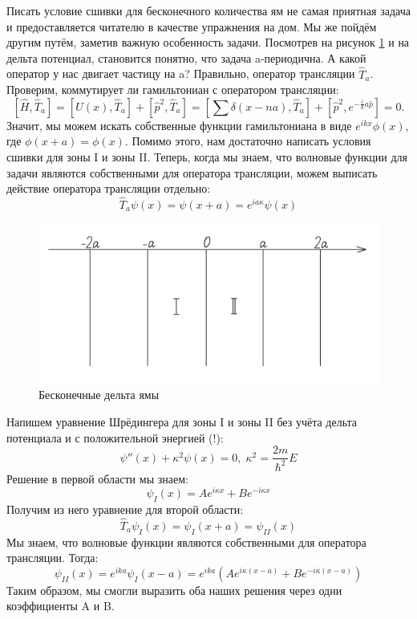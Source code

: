Писать условие сшивки для бесконечного количества ям не самая приятная задача и предоставляется читателю в качестве упражнения на дом. Мы же пойдём другим путём, заметив важную особенность задачи. Посмотрев на рисунок \ref{fig 4.5} и на дельта потенциал, становится понятно, что задача a-периодична. А какой оператор у нас двигает частицу на a? Правильно, оператор трансляции $\hat{T}_a$. Проверим, коммутирует ли гамильтониан с оператором трансляции:
\[
[\hat{H}, \hat{T}_a] = [U(x), \hat{T}_a] + [\hat{p}^2, \hat{T}_a] = [\sum\delta(x-na), \hat{T}_a] + [\hat{p}^2, e^{-\frac{i}{\hbar}a\hat{p}}] = 0.
\]
Значит, мы можем искать собственные функции гамильтониана в виде $e^{ikx}\phi(x)$, где $\phi(x + a) = \phi(x)$. Помимо этого, нам достаточно написать условия сшивки для зоны I и зоны II. Теперь, когда мы знаем, что волновые функции для задачи являются собственными для оператора трансляции, можем выписать действие оператора трансляции отдельно:
\[
\hat{T}_a\psi(x) = \psi(x+a) = e^{ia\kappa}\psi(x)
\]
\begin{figure}[!ht]
\centering
\includegraphics[scale=0.27]{class_4/images/inf delta hole.png}
\caption{Бесконечные дельта ямы}
\label{fig 4.5}
\end{figure}

Напишем уравнение Шрёдингера для зоны I и зоны II без учёта дельта потенциала и с положительной энергией (!):
\[
\psi''(x) + \kappa^2\psi(x) = 0, \; \kappa^2 = \frac{2m}{\hbar^2}E
\]
Решение в первой области мы знаем:
\[
\psi_I(x) = Ae^{i\kappa x} + Be^{-i\kappa x}
\]
Получим из него уравнение для второй области:
\[
\hat{T}_a\psi_I(x) = \psi_I(x+a) = \psi_{II}(x)
\]
Мы знаем, что волновые функции являются собственными для оператора трансляции. Тогда:
\[
\psi_{II}(x) = e^{ika}\psi_I(x-a) = e^{ika}(Ae^{i\kappa (x-a)} + Be^{-i\kappa (x - a)})
\]
Таким образом, мы смогли выразить оба наших решения через одни коэффициенты A и B.

